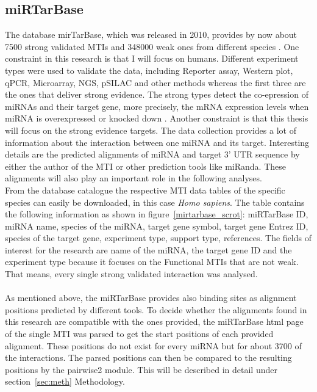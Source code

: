\documentclass[11pt, a4paper, oneside]{book}
\begin{document}
\subsection{miRTarBase}
The database mirTarBase, which was released in 2010, provides by now about 7500 strong validated MTIs and 348000 weak ones from different species \cite{Chou}. One constraint in this research is that I will focus on humans. Different experiment types were used to validate the data, including Reporter assay, Western plot, qPCR, Microarray, NGS, pSILAC and other methods whereas the first three are the ones that deliver strong evidence. The strong types detect the co-epression of miRNAs and their target gene, more precisely, the mRNA expression levels when miRNA is overexpressed or knocked down  \cite{Hsu}. Another constraint is that this thesis will focus on the strong evidence targets. The data collection provides a lot of information about the interaction between one miRNA and its target. Interesting details are the predicted alignments of miRNA and target 3' UTR sequence by either the author of the MTI or other prediction tools like miRanda. These alignments will also play an important role in the following analyses. \\

From the database catalogue the respective MTI data tables of the specific species can easily be downloaded, in this case \textit{Homo sapiens}. The table contains the following information as shown in figure~\ref{mirtarbase_scrot}: miRTarBase ID, miRNA name, species of the miRNA, target gene symbol, target gene Entrez ID, species of the target gene, experiment type, support type, references. The fields of interest for the research are name of the miRNA, the target gene ID and the experiment type because it focuses on the Functional MTIs that are not weak. That means, every single strong validated interaction was analysed.\\\\

As mentioned above, the miRTarBase provides also binding sites as alignment positions predicted by different tools. To decide whether the alignments found in this research are compatible with the ones provided, the miRTarBase html page of the single MTI was parsed to get the start positions of each provided alignment. These positions do not exist for every miRNA but for about 3700 of the interactions. The parsed positions can then be compared to the resulting positions by the pairwise2 module. This will be described in detail under section~\ref{sec:meth} Methodology.\\ 
\end{document}

